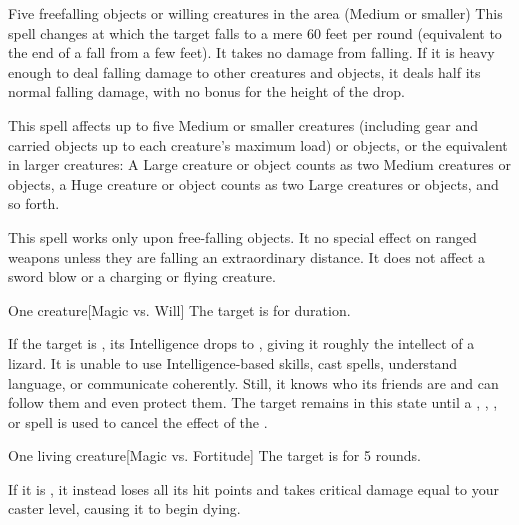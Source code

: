 \begin{spelltargets}{Five freefalling objects or willing creatures in the area (Medium or smaller)}
    \spelleffect This spell changes at which the target falls to a mere 60 feet per round (equivalent to the end of a fall from a few feet). It takes no damage from falling. If it is heavy enough to deal falling damage to other creatures and objects, it deals half its normal falling damage, with no bonus for the height of the drop.
\end{spelltargets}
\spellnotes This spell affects up to five Medium or smaller creatures (including gear and carried objects up to each creature's maximum load) or objects, or the equivalent in larger creatures: A Large creature or object counts as two Medium creatures or objects, a Huge creature or object counts as two Large creatures or objects, and so forth.

This spell works only upon free-falling objects. It no special effect on ranged weapons unless they are falling an extraordinary distance. It does not affect a sword blow or a charging or flying creature.

\spellrng{\rngclose}
\begin{spelltarget}{One creature}[Magic vs. Will]
    \spellsuccess The target is \bewildered for \durshort duration.

    If the target is \bloodied, its Intelligence drops to , giving it roughly the intellect of a lizard. It is unable to use Intelligence-based skills, cast spells, understand language, or communicate coherently. Still, it knows who its friends are and can follow them and even protect them. The target remains in this state until a , , , or  spell is used to cancel the effect of the .
\end{spelltarget}

\spellrng{\rngclose}
\begin{spelltarget}{One living creature}[Magic vs. Fortitude]
    \spellsuccess The target is \staggered for 5 rounds.

    If it is \bloodied, it instead loses all its hit points and takes critical damage equal to your caster level, causing it to begin dying.
\end{spelltarget}

